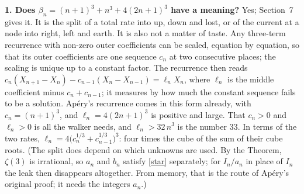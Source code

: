\documentclass[11pt]{article}
\newcommand{\q}[1]{\medskip\noindent\textbf{#1}}
\begin{document}
\q{1. Does $\beta_n=(n+1)^3+n^3+4(2n+1)^3$ have a meaning?} Yes; Section~7 gives it. It is the
split of a total rate into up, down and lost, or of the current at a node into right, left and
earth. It is also not a matter of taste. Any three-term recurrence with non-zero outer coefficients can be scaled, equation by
equation, so that its outer coefficients are one sequence $c_n$ at two consecutive places; the
scaling is unique up to a constant factor. The recurrence then reads
$c_n(X_{n+1}-X_n)-c_{n-1}(X_n-X_{n-1})=\ell_nX_n$, where $\ell_n$ is the middle coefficient minus
$c_n+c_{n-1}$; it measures by how much the constant sequence fails to be a solution. Ap\'ery's
recurrence comes in this form already, with $c_n=(n+1)^3$, and $\ell_n=4(2n+1)^3$ is positive and
large. That $c_n>0$ and $\ell_n>0$ is all the walker needs, and $\ell_n>32\,n^3$ is the number $33$. In
terms of the two rates, $\ell_n=4\bigl(c_n^{1/3}+c_{n-1}^{1/3}\bigr)^3$: four times the cube of the
sum of their cube roots. (The split does depend on which unknowns are used. By the Theorem,
$\zeta(3)$ is irrational, so $a_n$ and $b_n$ satisfy \eqref{star} separately; for $I_n/a_n$ in place
of $I_n$ the leak then disappears altogether. From memory, that is the route of Ap\'ery's original
proof; it needs the integers $a_n$.)
\end{document}
